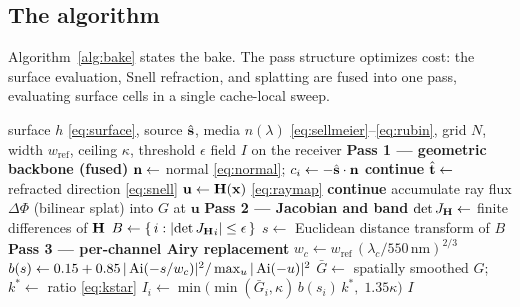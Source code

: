 \subsection{The algorithm}
\label{sec:ours-algorithm}

Algorithm~\ref{alg:bake} states the bake. The pass structure optimizes cost:
the surface evaluation, Snell refraction, and splatting are fused into one pass,
evaluating surface cells in a single cache-local sweep.

\begin{algorithm}[t]
\caption{The wave-corrected bake}
\label{alg:bake}
\begin{algorithmic}[1]
\Require surface $h$ \eqref{eq:surface}, source $\hat{\mathbf{s}}$, media $n(\lambda)$
         \eqref{eq:sellmeier}--\eqref{eq:rubin}, grid $N$, width $w_{\text{ref}}$,
         ceiling $\kappa$, threshold $\epsilon$
\Ensure field $I$ on the receiver
\Statex
\Statex \textbf{Pass 1 --- geometric backbone (fused)}
    \State $\mathbf{n} \gets$ normal \eqref{eq:normal}; \quad $c_i \gets -\hat{\mathbf{s}}\cdot\mathbf{n}$
     \textbf{continue} 
    \EndIf
    \State $\hat{\mathbf{t}} \gets$ refracted direction \eqref{eq:snell}
    \State $\mathbf{u} \gets \mathbf{H}(\mathbf{x})$ \eqref{eq:raymap}
     \textbf{continue} 
    \EndIf
    \State accumulate ray flux $\Delta\Phi$ (bilinear splat) into $G$ at $\mathbf{u}$
\EndFor
\Statex
\Statex \textbf{Pass 2 --- Jacobian and band}
\State $\det J_{\mathbf{H}} \gets$ finite differences of $\mathbf{H}$ \Comment{\eqref{eq:raymap}}
\State $B \gets \{\,i : |{\det J_{\mathbf{H}}}_i| \le \epsilon\,\}$ 
\State $s \gets$ Euclidean distance transform of $B$
\Statex
\Statex \textbf{Pass 3 --- per-channel Airy replacement}
    \State $w_c \gets w_{\text{ref}}\,(\lambda_c/550\,\text{nm})^{2/3}$
    \State $b(s) \gets 0.15 + 0.85\,|\operatorname{Ai}(-s/w_c)|^2 / \max_u|\operatorname{Ai}(-u)|^2$
          \Comment{\eqref{eq:profile}}
    \State $\bar G \gets$ spatially smoothed $G$; \quad
           $k^{*} \gets$ ratio \eqref{eq:kstar}
        \State $I_i \gets \min\big(\min(\bar G_i,\kappa)\,b(s_i)\,k^{*},\;1.35\kappa\big)$
    \EndFor
\EndFor
\State \Return $I$
\end{algorithmic}
\end{algorithm}

